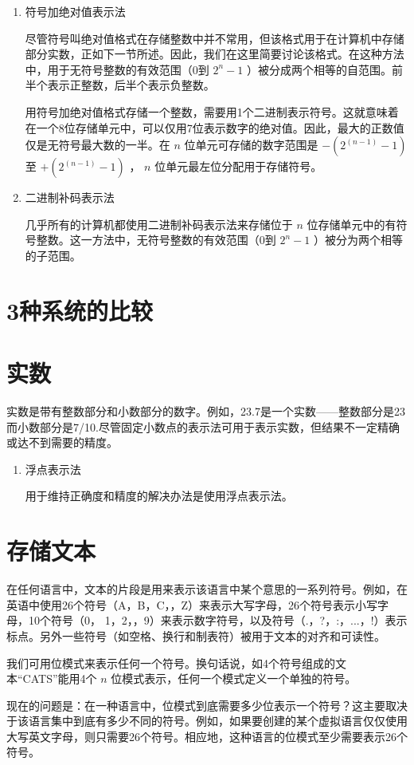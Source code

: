 \begin{enumerate}
\begin{itemize}
	\end{itemize}
	\item 符号加绝对值表示法

	尽管符号叫绝对值格式在存储整数中并不常用，但该格式用于在计算机中存储部分实数，正如下一节所述。因此，我们在这里简要讨论该格式。在这种方法中，用于无符号整数的有效范围（0到
	$2^n-1$
	）被分成两个相等的自范围。前半个表示正整数，后半个表示负整数。

	用符号加绝对值格式存储一个整数，需要用1个二进制表示符号。这就意味着在一个8位存储单元中，可以仅用7位表示数字的绝对值。因此，最大的正数值仅是无符号最大数的一半。在
	$n$
	位单元可存储的数字范围是
	$-(2^(n-1)-1)$
	至
	$+(2^(n-1) - 1)$
	，
	$n$
	位单元最左位分配用于存储符号。
	\item 二进制补码表示法

	几乎所有的计算机都使用二进制补码表示法来存储位于
	$n$
	位存储单元中的有符号整数。这一方法中，无符号整数的有效范围（0到
	$2^n-1$
	）被分为两个相等的子范围。
\end{enumerate}
\section{3种系统的比较}
\section{实数}
实数是带有整数部分和小数部分的数字。例如，23.7是一个实数——整数部分是23而小数部分是7/10.尽管固定小数点的表示法可用于表示实数，但结果不一定精确或达不到需要的精度。

\begin{enumerate}
	\item 浮点表示法

	用于维持正确度和精度的解决办法是使用浮点表示法。
\end{enumerate}
\section{存储文本}
在任何语言中，文本的片段是用来表示该语言中某个意思的一系列符号。例如，在英语中使用26个符号（A，B，C，\cdots，Z）来表示大写字母，26个符号表示小写字母，10个符号（0， 1，2，，9）来表示数字符号，以及符号（.，?，:，...，!）表示标点。另外一些符号（如空格、换行和制表符）被用于文本的对齐和可读性。

我们可用位模式来表示任何一个符号。换句话说，如4个符号组成的文本“CATS”能用4个
$n$
位模式表示，任何一个模式定义一个单独的符号。

现在的问题是：在一种语言中，位模式到底需要多少位表示一个符号？这主要取决于该语言集中到底有多少不同的符号。例如，如果要创建的某个虚拟语言仅仅使用大写英文字母，则只需要26个符号。相应地，这种语言的位模式至少需要表示26个符号。

